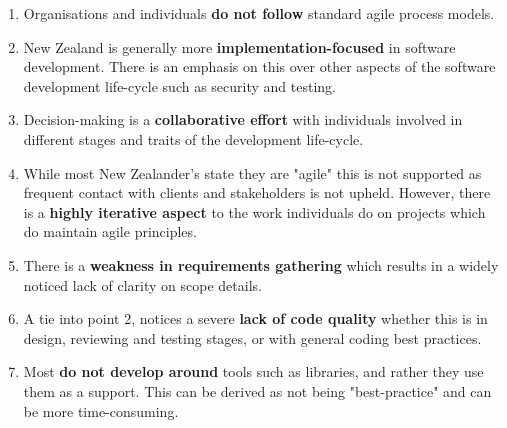 \begin{enumerate}
\item Organisations and individuals \textbf{do not follow} standard agile process models.
\item New Zealand is generally more \textbf{implementation-focused} in software development. There is an emphasis on this over other aspects of the software development life-cycle such as security and testing. 
\item Decision-making is a \textbf{collaborative effort} with individuals involved in different stages and traits of the development life-cycle. 
\item While most New Zealander's state they are "agile" this is not supported as frequent contact with clients and stakeholders is not upheld. However, there is a \textbf{highly iterative aspect} to the work individuals do on projects which do maintain agile principles. 
\item There is a \textbf{weakness in requirements gathering} which results in a widely noticed lack of clarity on scope details. 
\item A tie into point 2, notices a severe \textbf{lack of code quality} whether this is in design, reviewing and testing stages, or with general coding best practices. 
\item Most \textbf{do not develop around }tools such as libraries, and rather they use them as a support. This can be derived as not being "best-practice" and can be more time-consuming. 
\end{enumerate}

